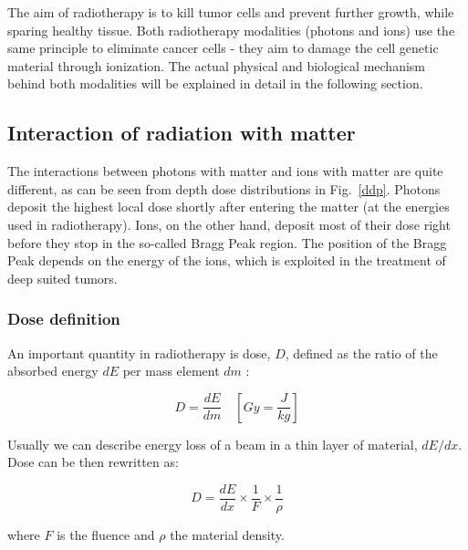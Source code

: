 The aim of radiotherapy is to kill tumor cells and prevent further growth, while sparing healthy tissue. Both radiotherapy modalities (photons and ions) use the same principle to eliminate cancer cells - 
they aim to damage the cell genetic material through ionization. The actual physical and biological mechanism behind both modalities will be explained in detail in the following section.

\subsection{Interaction of radiation with matter}

The interactions between photons with matter and ions with matter are quite different, as can be seen from depth dose distributions in Fig.~\ref{ddp}. Photons deposit the highest local dose shortly after entering the matter 
(at the energies used in radiotherapy). Ions, on the other hand, deposit most of their dose right before they stop in the so-called Bragg Peak region. The position of the Bragg Peak depends on the energy of the ions, which is exploited in the treatment
of deep suited tumors.

\subsubsection{Dose definition}

An important quantity in radiotherapy is dose, $D$, defined as the ratio of the absorbed energy $dE$ per mass element $dm$ \cite{ICRU1993}:

\begin{equation}
 D = \frac{dE}{dm} \quad \left[ Gy = \frac{J}{kg} \right]
\end{equation}

Usually we can describe energy loss of a beam in a thin layer of material, $dE/dx$. Dose can be then rewritten as:

\begin{equation}
 D = \frac{dE}{dx} \times \frac{1}{F} \times \frac{1}{\rho}
\end{equation}

where $F$ is the fluence and $\rho$ the material density.


\newpage

